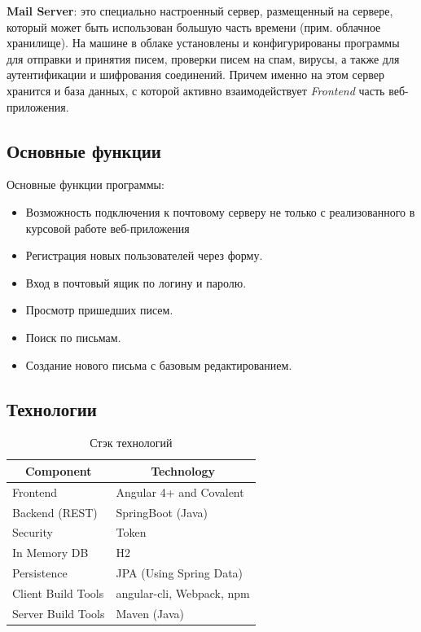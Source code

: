 \documentclass{article}
\begin{document}
\textbf{Mail Server}: это специально настроенный сервер, размещенный на сервере, который может быть использован большую часть времени (прим. облачное хранилище). На машине в облаке установлены и конфигурированы программы для отправки и принятия писем, проверки писем на спам, вирусы, а также для аутентификации и шифрования соединений. Причем именно на этом сервер хранится и база данных, с которой активно взаимодействует \emph{Frontend} часть веб-приложения. \\

\subsection{Основные функции}

Основные функции программы:

\begin{itemize}
  \item Возможность подключения к почтовому серверу не только с реализованного в курсовой работе веб-приложения
  \item Регистрация новых пользователей через форму.
  \item Вход в почтовый ящик по логину и паролю.
  \item Просмотр пришедших писем.
  \item Поиск по письмам.
  \item Создание нового письма с базовым редактированием.
\end{itemize}

\subsection{Технологии}

\begin{table}[]
\centering
\begin{tabular}{|l|l|}
\hline
\multicolumn{1}{|c|}{\textbf{Component}} & \multicolumn{1}{c|}{\textbf{Technology}} \\ \hline
Frontend                                 & Angular 4+ and Covalent                  \\
Backend (REST)                           & SpringBoot (Java)                        \\
Security                                 & Token                                    \\
In Memory DB                             & H2                                       \\
Persistence                              & JPA (Using Spring Data)                  \\
Client Build Tools                       & angular-cli, Webpack, npm                \\
Server Build Tools                       & Maven (Java)                             \\ \hline
\end{tabular}
\caption{Стэк технологий}
\label{my-label}
\end{table}
\end{document}
